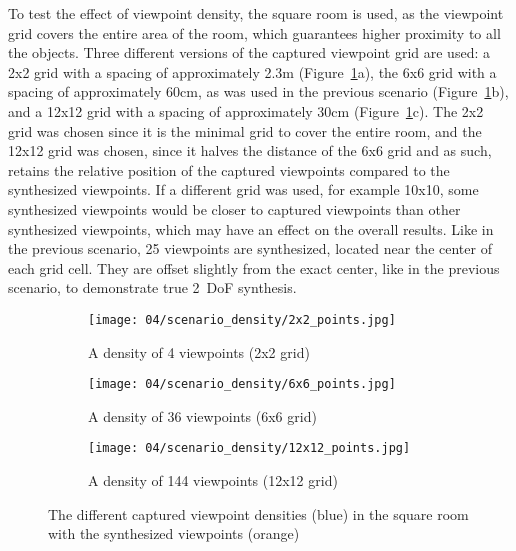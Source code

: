 To test the effect of viewpoint density, the square room is used, as the viewpoint grid covers the entire area of the room, which guarantees higher proximity to all the objects. Three different versions of the captured viewpoint grid are used: a 2x2 grid with a spacing of approximately 2.3m (Figure~\ref{fig:density_setup}a), the 6x6 grid with a spacing of approximately 60cm, as was used in the previous scenario (Figure~\ref{fig:density_setup}b), and a 12x12 grid with a spacing of approximately 30cm (Figure~\ref{fig:density_setup}c). The 2x2 grid was chosen since it is the minimal grid to cover the entire room, and the 12x12 grid was chosen, since it halves the distance of the 6x6 grid and as such, retains the relative position of the captured viewpoints compared to the synthesized viewpoints. If a different grid was used, for example 10x10, some synthesized viewpoints would be closer to captured viewpoints than other synthesized viewpoints, which may have an effect on the overall results.
Like in the previous scenario, 25 viewpoints are synthesized, located near the center of each grid cell. They are offset slightly from the exact center, like in the previous scenario, to demonstrate true 2~DoF synthesis.

\begin{figure}
\centering
    \hfill
    \begin{subfigure}[t]{0.3\textwidth}
            \centering
            \texttt{[image: 04/scenario\_density/2x2\_points.jpg]}
            \caption{A density of 4 viewpoints (2x2 grid)}
    \end{subfigure}
    \hfill
    \begin{subfigure}[t]{0.3\textwidth}
            \centering
            \texttt{[image: 04/scenario\_density/6x6\_points.jpg]}
            \caption{A density of 36 viewpoints (6x6 grid)}
    \end{subfigure}
    \hfill
    \begin{subfigure}[t]{0.3\textwidth}
            \centering
            \texttt{[image: 04/scenario\_density/12x12\_points.jpg]}
            \caption{A density of 144 viewpoints (12x12 grid)}
    \end{subfigure}
    \hfill
  \caption[The different captured viewpoint densities in the square room]{The different captured viewpoint densities (blue) in the square room with the synthesized viewpoints (orange)} \label{fig:density_setup}
\end{figure}

